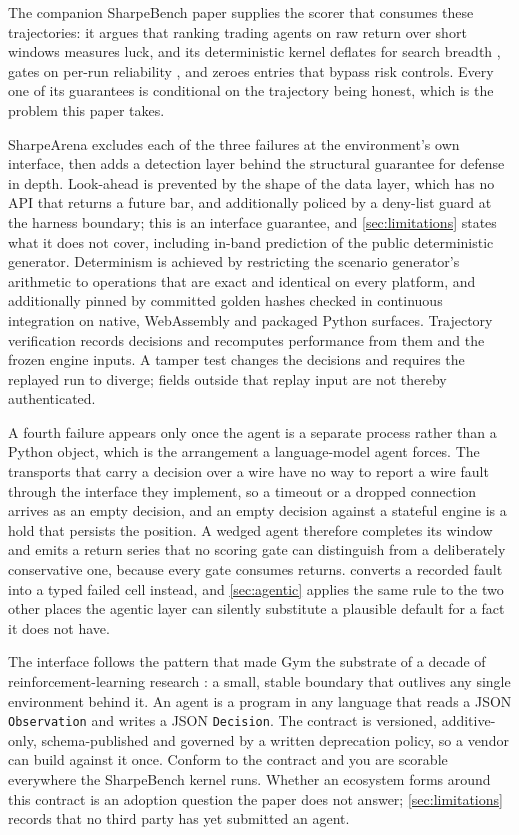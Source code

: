 The companion SharpeBench paper \citep{toca2026sharpebench} supplies the scorer that consumes these trajectories: it argues that ranking trading agents on raw return over short windows measures luck, and its deterministic kernel deflates for search breadth \citep{bailey2014deflated}, gates on per-run reliability \citep{yao2024taubench}, and zeroes entries that bypass risk controls. Every one of its guarantees is conditional on the trajectory being honest, which is the problem this paper takes.

SharpeArena excludes each of the three failures at the environment's own interface, then adds a detection layer behind the structural guarantee for defense in depth. Look-ahead is prevented by the shape of the data layer, which has no API that returns a future bar, and additionally policed by a deny-list guard at the harness boundary; this is an interface guarantee, and \cref{sec:limitations} states what it does not cover, including in-band prediction of the public deterministic generator. Determinism is achieved by restricting the scenario generator's arithmetic to operations that are exact and identical on every platform, and additionally pinned by committed golden hashes checked in continuous integration on native, WebAssembly and packaged Python surfaces. Trajectory verification records decisions and recomputes performance from them and the frozen engine inputs. A tamper test changes the decisions and requires the replayed run to diverge; fields outside that replay input are not thereby authenticated.

A fourth failure appears only once the agent is a separate process rather than a Python object, which is the arrangement a language-model agent forces. The transports that carry a decision over a wire have no way to report a wire fault through the interface they implement, so a timeout or a dropped connection arrives as an empty decision, and an empty decision against a stateful engine is a hold that persists the position. A wedged agent therefore completes its window and emits a return series that no scoring gate can distinguish from a deliberately conservative one, because every gate consumes returns.  converts a recorded fault into a typed failed cell instead, and \cref{sec:agentic} applies the same rule to the two other places the agentic layer can silently substitute a plausible default for a fact it does not have.

The interface follows the pattern that made Gym the substrate of a decade of reinforcement-learning research \citep{brockman2016gym,towers2024gymnasium}: a small, stable boundary that outlives any single environment behind it. An agent is a program in any language that reads a JSON \texttt{Observation} and writes a JSON \texttt{Decision}. The contract is versioned, additive-only, schema-published and governed by a written deprecation policy, so a vendor can build against it once. Conform to the contract and you are scorable everywhere the SharpeBench kernel runs. Whether an ecosystem forms around this contract is an adoption question the paper does not answer; \cref{sec:limitations} records that no third party has yet submitted an agent.

